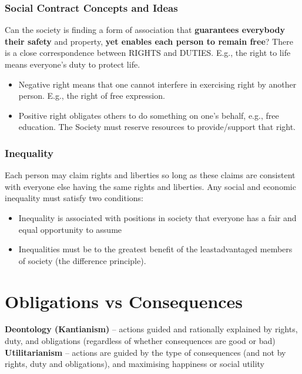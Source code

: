 \documentclass{article}
\begin{document}
\subsubsection{Social Contract Concepts and Ideas}
\begin{flushleft}
Can the society is finding a form of association that \textbf{guarantees everybody their safety} and property, \textbf{yet enables each person to remain free}? There is a close correspondence between RIGHTS and DUTIES. E.g., the right to life means everyone’s duty to protect life.
\begin{itemize}
  \item Negative right means that one cannot interfere in exercising right by another person. E.g., the right of free expression.
  \item Positive right obligates others to do something on one’s behalf, e.g., free education. The Society must reserve resources to provide/support that right.
\end{itemize}
\end{flushleft}

\subsubsection{Inequality}
Each person may claim rights and liberties so long as these claims are consistent with everyone else having the same rights and liberties. Any social and economic inequality must satisfy two conditions:
\begin{itemize}
  \item Inequality is associated with positions in society that everyone has a fair and equal opportunity to assume
  \item Inequalities must be to the greatest benefit of the leastadvantaged members of society (the difference principle).
\end{itemize}

\section{Obligations vs Consequences}
\begin{flushleft}
\textbf{Deontology (Kantianism)} – actions guided and rationally explained by rights, duty, and obligations (regardless of whether consequences are good or bad)\\
\textbf{Utilitarianism} – actions are guided by the type of consequences (and not by rights, duty and obligations), and maximising happiness or social utility
\end{flushleft}
\end{document}
